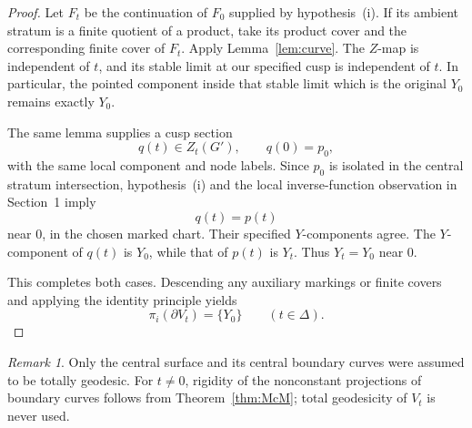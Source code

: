 \documentclass[11pt]{article}
\newcommand{\D}{\Delta}
\theoremstyle{remark}
\newtheorem{remark}[theorem]{Remark}
\begin{document}
\begin{proof}
Let \(F_t\) be the continuation of \(F_0\) supplied by
hypothesis~(i). If its ambient stratum is a finite quotient
of a product, take its product cover and the corresponding
finite cover of \(F_t\). Apply Lemma~\ref{lem:curve}.
The \(Z\)-map is independent of \(t\), and its stable limit
at our specified cusp is independent of \(t\).
In particular, the pointed component inside that stable
limit which is the original \(Y_0\) remains exactly \(Y_0\).

The same lemma supplies a cusp section
\[
q(t)\in Z_t(G'),
\qquad q(0)=p_0,
\]
with the same local component and node labels.
Since \(p_0\) is isolated in the central stratum intersection,
hypothesis~(i) and the local inverse-function observation in
Section~1  imply
\[
q(t)=p(t)
\]
near \(0\), in the chosen marked chart.
Their specified \(Y\)-components agree. The \(Y\)-component
of \(q(t)\) is \(Y_0\), while that of \(p(t)\) is \(Y_t\).
Thus \(Y_t=Y_0\) near \(0\).

This completes both cases. Descending any auxiliary markings
or finite covers and applying the identity principle yields
\[
\pi_i(\partial V_t)=\{Y_0\}
\qquad(t\in\D).
\]
\end{proof}

\begin{remark}
Only the central surface and its central boundary curves were
assumed to be totally geodesic. For \(t\ne0\), rigidity of the
nonconstant projections of boundary curves follows from
Theorem~\ref{thm:McM}; total geodesicity of \(V_t\) is never
used.
\end{remark}
\end{document}

